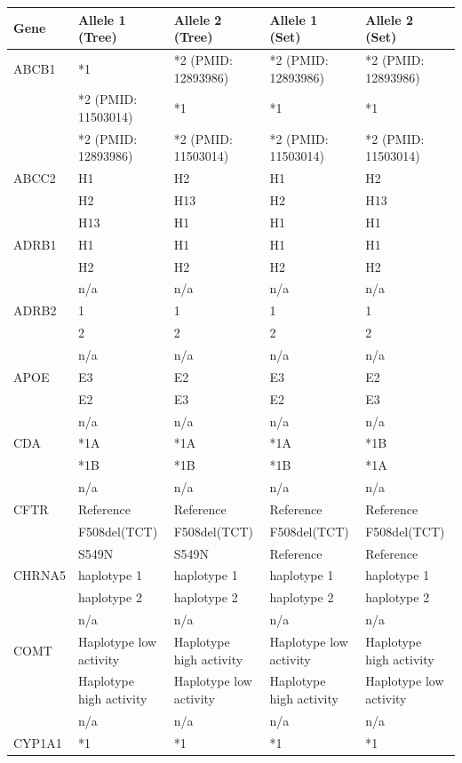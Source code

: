\documentclass{report}
\begin{document}
\begin{tabularx}{\textwidth}{ X | XXXX }
\toprule
\textbf{Gene} & \textbf{Allele 1 (Tree) } & \textbf{Allele 2 (Tree)} & \textbf{Allele 1 (Set) } & \textbf{Allele 2 (Set)} \\
\midrule
ABCB1
& *1 & *2 (PMID: 12893986) & *2 (PMID: 12893986) & *2 (PMID: 12893986) \\
& *2 (PMID: 11503014) & *1 & *1 & *1  \\
& *2 (PMID: 12893986) & *2 (PMID: 11503014) & *2 (PMID: 11503014) & *2 (PMID: 11503014) \\
\midrule
ABCC2
& H1 & H2 & H1 & H2 \\
& H2 & H13 & H2 & H13  \\
& H13 & H1 & H1 & H1 \\
\midrule
ADRB1
& H1 & H1 & H1 & H1 \\
& H2 & H2 & H2 & H2  \\
& n/a & n/a & n/a & n/a \\
\midrule
ADRB2
& 1 & 1 & 1 & 1 \\
& 2 & 2 & 2 & 2  \\
& n/a & n/a & n/a & n/a \\
\midrule
APOE
& E3 & E2 & E3 & E2 \\
& E2 & E3 & E2 & E3  \\
& n/a & n/a & n/a & n/a \\
\midrule
CDA
& *1A & *1A & *1A & *1B \\
& *1B & *1B & *1B & *1A  \\
& n/a & n/a & n/a & n/a \\
\midrule
CFTR
& Reference & Reference & Reference & Reference \\
& F508del(TCT) & F508del(TCT) & F508del(TCT) & F508del(TCT)  \\
& S549N & S549N & Reference & Reference \\
\midrule
CHRNA5
& haplotype 1 & haplotype 1 & haplotype 1 & haplotype 1 \\
& haplotype 2 & haplotype 2 & haplotype 2 & haplotype 2  \\
& n/a & n/a & n/a & n/a \\
\midrule
COMT
& Haplotype low activity & Haplotype high activity & Haplotype low activity & Haplotype high activity \\
& Haplotype high activity & Haplotype low activity & Haplotype high activity & Haplotype low activity  \\
& n/a & n/a & n/a & n/a \\
\midrule
CYP1A1
& *1 & *1 & *1 & *1 \\

\end{tabularx}
\end{document}
